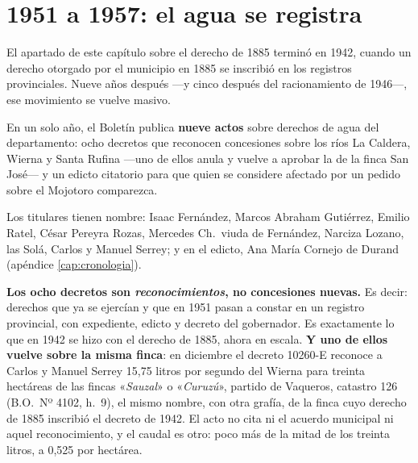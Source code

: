 \section{1951 a 1957: el agua se registra}

El apartado de este capítulo sobre el derecho de 1885 terminó en 1942, cuando un derecho otorgado por el
municipio en 1885 se inscribió en los registros provinciales. Nueve años después ---y cinco
después del racionamiento de 1946---, ese movimiento se vuelve masivo.

En un solo año, el Boletín publica \textbf{nueve actos} sobre derechos de agua del
departamento: ocho decretos que reconocen concesiones sobre los ríos La Caldera, Wierna y
Santa Rufina ---uno de ellos anula y vuelve a aprobar la de la finca San José--- y un edicto
citatorio para que quien se considere afectado por un pedido sobre el Mojotoro comparezca.

Los titulares tienen nombre: Isaac Fernández, Marcos Abraham Gutiérrez, Emilio Ratel, César
Pereyra Rozas, Mercedes Ch.\ viuda de Fernández, Narciza Lozano, las Solá, Carlos y Manuel
Serrey; y en el edicto, Ana María Cornejo de Durand (apéndice \ref{cap:cronologia}).

\textbf{Los ocho decretos son \textit{reconocimientos}, no concesiones nuevas.} Es decir: derechos que
ya se ejercían y que en 1951 pasan a constar en un registro provincial, con expediente,
edicto y decreto del gobernador. Es exactamente lo que en 1942 se hizo con el derecho de
1885, ahora en escala. \textbf{Y uno de ellos vuelve sobre la misma finca}: en diciembre el
decreto 10260-E reconoce a Carlos y Manuel Serrey 15,75 litros por segundo del Wierna para
treinta hectáreas de las fincas «\textit{Sauzal}» o «\textit{Curuzú}», partido de Vaqueros,
catastro 126 (B.O.\ Nº 4102, h.\ 9), el mismo nombre, con otra grafía, de la finca cuyo derecho
de 1885 inscribió el decreto de 1942. El acto no cita ni el acuerdo municipal ni aquel
reconocimiento, y el caudal es otro: poco más de la mitad de los treinta litros, a 0,525 por hectárea.

